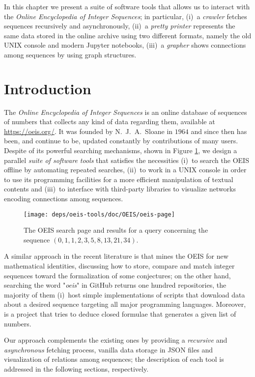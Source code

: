 
In this chapter we present a suite of software tools that allows us to interact
with the \textit{Online Encyclopedia of Integer Sequences}; in particular,
(i)~a \textit{crawler} fetches sequences recursively and asynchronously, (ii)~a
\textit{pretty printer} represents the same data stored in the online archive
using two different formats, namely the old UNIX console and modern Jupyter
notebooks, (iii)~a \textit{grapher} shows connections among sequences by using
graph structures.

\section{Introduction}

The \textit{Online Encyclopedia of Integer Sequences} \citep{OEIS} is an online
database of sequences of numbers that collects any kind of data regarding them,
available at \url{https://oeis.org/}.  It was founded by N.~J.~A.~Sloane in
$1964$ and since then has been, and continue to be, updated constantly by
contributions of many users. Despite of its powerful searching mechanisms,
shown in Figure \ref{fig:oeis:page}, we design a parallel \textit{suite of
software tools} that satisfies the necessities (i)~to search the OEIS offline
by automating repeated searches, (ii)~to work in a UNIX console in order to use
its programming facilities for a more efficient manipulation of textual
contents and (iii)~to interface with third-party libraries to visualize networks 
encoding connections among sequences.

\begin{figure}
\texttt{[image: deps/oeis-tools/doc/OEIS/oeis-page]}
\caption{The OEIS search page and results for a query concerning the sequence
$(0,1,1,2,3,5,8,13,21,34)$.}
\label{fig:oeis:page}
\end{figure}

A similar approach in the recent literature is \citep{Nguyen_miningthe} that
mines the OEIS for new mathematical identities, discussing how to store,
compare and match integer sequences toward the formalization of some
conjectures; on the other hand, searching the word "\textit{oeis}" in GitHub
returns one hundred repositories, the majority of them (i)~host simple
implementations of scripts that download data about a desired sequence
targeting all major programming languages. Moreover, \citep{weidmann:sequencer}
is a project that tries to deduce closed formulae that generates a given list
of numbers.

Our approach complements the existing ones by providing a \textit{recursive}
and \textit{asynchronous} fetching process, vanilla data storage in JSON files
and visualization of relations among sequences; the description of each tool is
addressed in the following sections, respectively.

